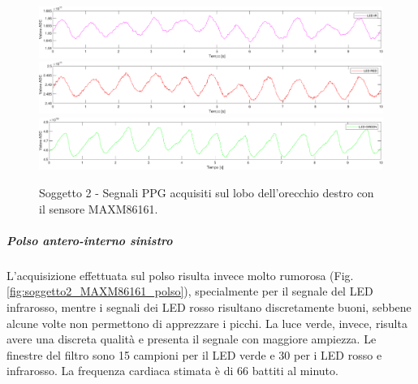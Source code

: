 \begin{figure}[h]
	\centering
	\includegraphics[width=1\linewidth]{ImageFiles/Misure Preliminari/Soggetto 2/maxm86161/lobo_ir_moving_avg}
	\includegraphics[width=1\linewidth]{ImageFiles/Misure Preliminari/Soggetto 2/maxm86161/lobo_red_moving_avg}
	\includegraphics[width=1\linewidth]{ImageFiles/Misure Preliminari/Soggetto 2/maxm86161/lobo_green_moving_avg}
	\caption{Soggetto 2 - Segnali PPG acquisiti sul lobo dell'orecchio destro con il sensore MAXM86161.}
	\label{fig:soggetto2_MAXM86161_lobo}
\end{figure}

\clearpage

\subparagraph{Polso antero-interno sinistro}
L'acquisizione effettuata sul polso risulta invece molto rumorosa (Fig. \ref{fig:soggetto2_MAXM86161_polso}), specialmente per il segnale del LED infrarosso, mentre i segnali dei LED rosso risultano discretamente buoni, sebbene alcune volte non permettono di apprezzare i picchi. La luce verde, invece, risulta avere una discreta qualità e presenta il segnale con maggiore ampiezza. Le finestre del filtro sono 15 campioni per il LED verde e 30 per i LED rosso e infrarosso. La frequenza cardiaca stimata è di 66 battiti al minuto.

